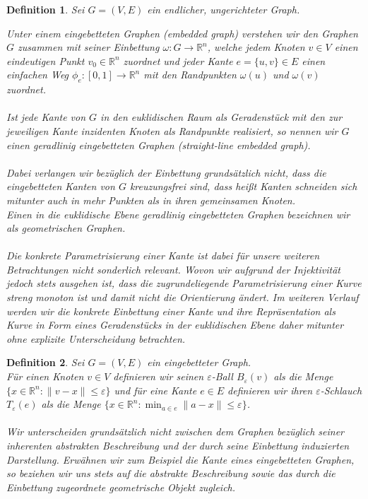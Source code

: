 \documentclass[a4paper, 12pt, twoside]{article}
\theoremstyle{Format1} %
\newtheorem{Def}{Definition}[section]       %
\begin{document}
\begin{Def}
	Sei $G=(V,E)$ ein endlicher, ungerichteter Graph.

	Unter einem \textit{eingebetteten Graphen (embedded graph)} verstehen wir den Graphen $G$
	zusammen mit seiner \textit{Einbettung} $\omega: G \to \mathbb{R}^n$, welche
	jedem Knoten $v \in V$ einen eindeutigen Punkt $v_0 \in \mathbb{R}^n$ zuordnet und jeder Kante $e = \{u,v\} \in E$
	einen einfachen Weg $\phi_e: [0,1] \to \mathbb{R}^n$ mit den Randpunkten $\omega(u)$ und $\omega(v)$ zuordnet.
	\\
	\\
	Ist jede Kante von $G$ in den euklidischen Raum als Geradenstück mit den zur jeweiligen Kante inzidenten Knoten als Randpunkte realisiert, so
	nennen wir $G$ einen \textit{geradlinig eingebetteten Graphen (straight-line embedded graph)}.
	\\
	\\
	Dabei verlangen wir bezüglich der Einbettung grundsätzlich nicht, dass die eingebetteten Kanten von $G$ \textit{kreuzungsfrei} sind,
	dass heißt Kanten schneiden sich mitunter auch in mehr Punkten als in ihren gemeinsamen Knoten.
	\\
	Einen in die euklidische Ebene geradlinig eingebetteten Graphen bezeichnen wir als \textit{geometrischen Graphen}.
	\\
	\\
	Die konkrete Parametrisierung einer Kante ist dabei für unsere weiteren Betrachtungen nicht sonderlich relevant.
	Wovon wir aufgrund der Injektivität jedoch stets ausgehen ist, dass die zugrundeliegende Parametrisierung einer Kurve streng monoton ist und damit nicht die Orientierung ändert.
	Im weiteren Verlauf werden wir die konkrete Einbettung einer Kante und ihre Repräsentation als Kurve in Form eines Geradenstücks in der euklidischen
	Ebene daher mitunter ohne explizite Unterscheidung betrachten.
\end{Def}

\begin{Def}
	Sei $G=(V,E)$ ein eingebetteter Graph.
	\\
	Für einen Knoten $v \in V$ definieren wir seinen \textit{$\varepsilon$-Ball} $B_{\varepsilon}(v)$ als die Menge
	$\{x \in \mathbb{R}^n: \|v-x\| \leq \varepsilon\}$
	und für eine Kante $e \in E$ definieren wir ihren \textit{$\varepsilon$-Schlauch} $T_{\varepsilon}(e)$ als die Menge
	$\{x \in \mathbb{R}^n: \min_{a \in e}\|a-x\| \leq \varepsilon\}$.
	\\
	\\
	Wir unterscheiden grundsätzlich nicht zwischen dem Graphen bezüglich seiner inherenten abstrakten Beschreibung und der durch seine
	Einbettung induzierten Darstellung. Erwähnen wir zum Beispiel die Kante eines eingebetteten Graphen, so beziehen wir uns stets auf die abstrakte
	Beschreibung sowie das durch die Einbettung zugeordnete geometrische Objekt zugleich.
\end{Def}
\end{document}
